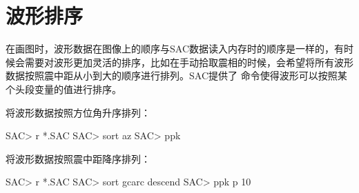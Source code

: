\section{波形排序}
在画图时，波形数据在图像上的顺序与SAC数据读入内存时的顺序是一样的，有时候会需要对波形更加灵活的排序，比如在手动拾取震相的时候，会希望将所有波形数据按照震中距从小到大的顺序进行排列。SAC提供了  命令使得波形可以按照某个头段变量的值进行排序。

将波形数据按照方位角升序排列：
\begin{SACCode}
SAC> r *.SAC
SAC> sort az
SAC> ppk
\end{SACCode}

将波形数据按照震中距降序排列：
\begin{SACCode}
SAC> r *.SAC
SAC> sort gcarc descend
SAC> ppk p 10
\end{SACCode}
